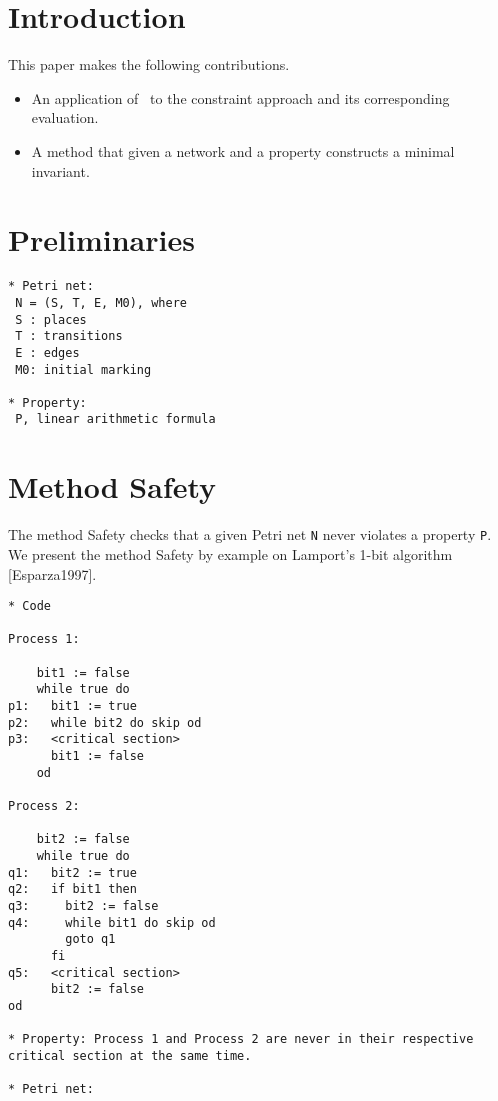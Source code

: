 \documentclass{llncs}
\begin{document}
\section{Introduction}

This paper makes the following contributions.
\begin{itemize}
\item An application of \zthree\ to the constraint approach and its
  corresponding evaluation.
\item A method that given a network and a property constructs a
  minimal invariant.
\end{itemize}


\section{Preliminaries}


\begin{verbatim}
* Petri net:
 N = (S, T, E, M0), where
 S : places
 T : transitions
 E : edges
 M0: initial marking

* Property:
 P, linear arithmetic formula
\end{verbatim}
\iffalse
\begin{verbatim}
 Examples:
  x + y < 0
  x + y < 0 \\and x + z > 0
  x + y < 0 \\or  x + z > 0

 ~P = (x + y <  0 \\and x + z >  0) \\or  x + z >  0
  P = (x + y >= 0 \\or  x + z <= 0) \\and x + z <= 0
\end{verbatim}
\fi

\newpage
\section{Method Safety}

The method Safety checks that a given Petri net \verb=N= never violates a property \verb=P=.
We present the method Safety by example on Lamport's 1-bit algorithm [Esparza1997].

\begin{verbatim}
* Code

Process 1:

    bit1 := false
    while true do
p1:   bit1 := true
p2:   while bit2 do skip od
p3:   <critical section>
      bit1 := false
    od

Process 2:

    bit2 := false
    while true do
q1:   bit2 := true
q2:   if bit1 then
q3:     bit2 := false
q4:     while bit1 do skip od
        goto q1
      fi
q5:   <critical section>
      bit2 := false
od

* Property: Process 1 and Process 2 are never in their respective critical section at the same time.

* Petri net:

\end{verbatim}
\end{document}
